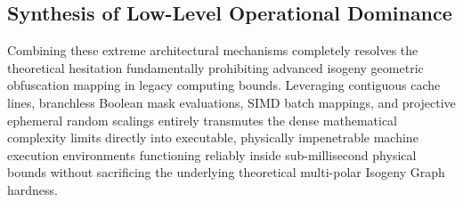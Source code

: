 \subsection{Synthesis of Low-Level Operational Dominance}
Combining these extreme architectural mechanisms completely resolves the theoretical hesitation fundamentally prohibiting advanced isogeny geometric obfuscation mapping in legacy computing bounds. Leveraging contiguous cache lines, branchless Boolean mask evaluations, SIMD batch mappings, and projective ephemeral random scalings entirely transmutes the dense mathematical complexity limits directly into executable, physically impenetrable machine execution environments functioning reliably inside sub-millisecond physical bounds without sacrificing the underlying theoretical multi-polar Isogeny Graph hardness.
